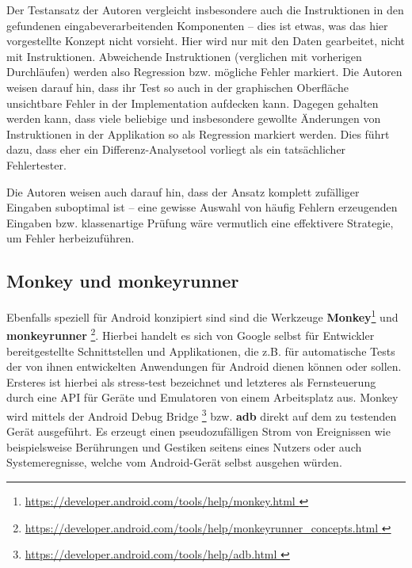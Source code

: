 Der Testansatz der Autoren vergleicht insbesondere auch die Instruktionen in den gefundenen
eingabeverarbeitenden Komponenten -- dies ist etwas, was das hier vorgestellte Konzept nicht
vorsieht. Hier wird nur mit den Daten gearbeitet, nicht mit Instruktionen. Abweichende
Instruktionen (verglichen mit vorherigen Durchläufen) werden also Regression bzw. mögliche Fehler markiert.
Die Autoren weisen darauf hin, dass ihr Test so auch in der graphischen Oberfläche
unsichtbare Fehler in der Implementation aufdecken kann. Dagegen gehalten werden kann,
dass viele beliebige und insbesondere gewollte Änderungen von Instruktionen in
der Applikation so als Regression markiert werden. Dies führt dazu, dass eher ein
Differenz-Analysetool vorliegt als ein tatsächlicher Fehlertester.

Die Autoren weisen auch darauf hin, dass der Ansatz komplett zufälliger Eingaben
suboptimal ist -- eine gewisse Auswahl von häufig Fehlern erzeugenden Eingaben
bzw. klassenartige Prüfung wäre vermutlich eine effektivere Strategie, um Fehler
herbeizuführen.


\subsection{Monkey und monkeyrunner}

Ebenfalls speziell für Android konzipiert sind sind die Werkzeuge
\textbf{Monkey}\footnote{ \url{ https://developer.android.com/tools/help/monkey.html }}
und \textbf{monkeyrunner}
\footnote{ \url{ https://developer.android.com/tools/help/monkeyrunner_concepts.html }}.
Hierbei handelt es sich von Google selbst für Entwickler bereitgestellte
Schnittstellen und Applikationen, die z.B. für automatische Tests 
der von ihnen entwickelten Anwendungen für Android dienen können oder sollen.
Ersteres ist hierbei als \glqq{}stress-test\grqq{} bezeichnet und letzteres
als \glqq{}Fernsteuerung durch eine API für Geräte und Emulatoren von 
einem Arbeitsplatz aus\grqq{}. Monkey wird mittels der Android Debug Bridge
\footnote{ \url{ https://developer.android.com/tools/help/adb.html }}
bzw. \textbf{adb} direkt auf dem zu testenden Gerät ausgeführt. Es erzeugt
einen pseudozufälligen Strom von Ereignissen wie beispielsweise
Berührungen und Gestiken seitens eines Nutzers oder auch Systemeregnisse,
welche vom Android-Gerät selbst ausgehen würden.

